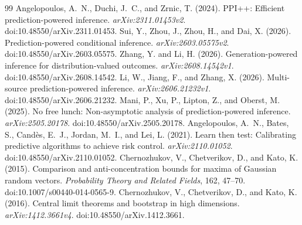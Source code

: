 \documentclass[11pt]{article}
\theoremstyle{remark}\newtheorem{remark}[theorem]{Remark}
\begin{document}
\begin{thebibliography}{99}
Angelopoulos, A.~N., Duchi, J.~C., and Zrnic, T. (2024).
PPI++: Efficient prediction-powered inference.
\emph{arXiv:2311.01453v2}. doi:10.48550/arXiv.2311.01453.
Sui, Y., Zhou, J., Zhou, H., and Dai, X. (2026).
Prediction-powered conditional inference.
\emph{arXiv:2603.05575v2}. doi:10.48550/arXiv.2603.05575.
Zhang, Y. and Li, H. (2026).
Generation-powered inference for distribution-valued outcomes.
\emph{arXiv:2608.14542v1}. doi:10.48550/arXiv.2608.14542.
Li, W., Jiang, F., and Zhang, X. (2026).
Multi-source prediction-powered inference.
\emph{arXiv:2606.21232v1}. doi:10.48550/arXiv.2606.21232.
Mani, P., Xu, P., Lipton, Z., and Oberst, M. (2025).
No free lunch: Non-asymptotic analysis of prediction-powered inference.
\emph{arXiv:2505.20178}. doi:10.48550/arXiv.2505.20178.
Angelopoulos, A.~N., Bates, S., Cand\`es, E.~J., Jordan, M.~I., and Lei, L. (2021).
Learn then test: Calibrating predictive algorithms to achieve risk control.
\emph{arXiv:2110.01052}. doi:10.48550/arXiv.2110.01052.
Chernozhukov, V., Chetverikov, D., and Kato, K. (2015).
Comparison and anti-concentration bounds for maxima of Gaussian random vectors.
\emph{Probability Theory and Related Fields}, 162, 47--70.
doi:10.1007/s00440-014-0565-9.
Chernozhukov, V., Chetverikov, D., and Kato, K. (2016).
Central limit theorems and bootstrap in high dimensions.
\emph{arXiv:1412.3661v4}. doi:10.48550/arXiv.1412.3661.
\end{thebibliography}
\end{document}
